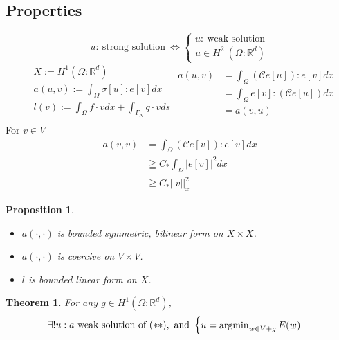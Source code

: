 \documentclass[a4paper,12pt]{article}
\newtheorem{prop}{Proposition}
\newtheorem{theorem}{Theorem}
\newcommand{\R}{\mathbb{R}}
\newcommand{\Cmod}{\mathcal{C}}
\newcommand{\argmin}{\operatornamewithlimits{argmin}}
\begin{document}
\subsection{Properties}
\begin{equation*}
u:\ \text{strong solution}\ \Leftrightarrow \begin{cases}
u:\ \text{weak solution}\\
u\in H^2\ (\Omega : \R^d)
\end{cases}
\end{equation*}
\begin{equation*}
\begin{aligned}
&X:= H^1(\Omega : \R^d)\\
&a(u,v) := \int_\Omega \sigma[u] : e[v] dx\\
&l(v) := \int_\Omega f\cdot v dx + \int_{\Gamma_N} q \cdot v ds\\
\end{aligned}
\begin{aligned}
a(u,v) &= \int_\Omega (\Cmod e[u]) : e[v] dx\\
&= \int_\Omega e[v] : (\Cmod e[u]) dx\\
&= a(v,u)
\end{aligned}
\end{equation*}
For $v \in V$
\begin{equation*}
\begin{aligned}
a(v,v) &= \int_\Omega (\Cmod e[v]) : e[v] dx\\
&\geqq C_* \int_\Omega |e[v]|^2 dx\\
&\geqq C_* ||v||^2_x
\end{aligned}
\end{equation*}
\begin{prop}
	\begin{itemize}
		\item $a(\cdot,\cdot)$ is bounded symmetric, bilinear form on $X \times X$.
		\item $a(\cdot,\cdot)$ is coercive on $V \times V$.
		\item $l$ is bounded linear form on $X$.
	\end{itemize}
\end{prop}
\begin{theorem}
	For any $g\in H^1(\Omega : \R^d)$,
	\begin{equation*}
	\exists! u:a\ \text{weak solution of}\ (**),\ \text{and}\ \begin{cases}
	u=\argmin_{w\in V+g}E(w)
	\end{cases}
	\end{equation*}
\end{theorem}
\end{document}
